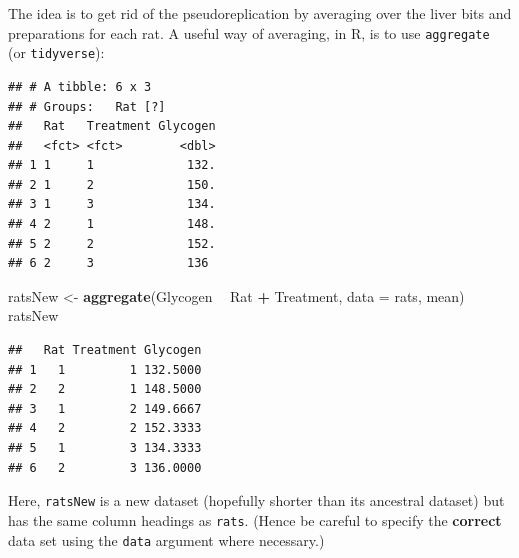 \documentclass[]{book}
\newenvironment{Shaded}{\begin{snugshade}}{\end{snugshade}}
\newcommand{\KeywordTok}[1]{\textcolor[rgb]{0.13,0.29,0.53}{\textbf{#1}}}
\newcommand{\DataTypeTok}[1]{\textcolor[rgb]{0.13,0.29,0.53}{#1}}
\newcommand{\StringTok}[1]{\textcolor[rgb]{0.31,0.60,0.02}{#1}}
\newcommand{\OperatorTok}[1]{\textcolor[rgb]{0.81,0.36,0.00}{\textbf{#1}}}
\newcommand{\NormalTok}[1]{#1}
\newcommand{\bmp}{\begin{minipage}[c]{0.5\textwidth}}
\newcommand{\emp}{\end{minipage}}
\newcommand{\bblockST}[1]{\begin{tcolorbox}[title = #1, colframe=taskCol1, breakable, parbox = false]}
\newcommand{\eblockST}{\end{tcolorbox}}
\theoremstyle{definition}
\theoremstyle{definition}
\theoremstyle{definition}
\theoremstyle{remark}
\begin{document}
The idea is to get rid of the pseudoreplication by averaging over the
liver bits and preparations for each rat. A useful way of averaging, in
R, is to use \texttt{aggregate} (or \texttt{tidyverse}):

\bmp
\bblockST{\texttt{tidyverse}}

\begin{Shaded}
\end{Shaded}

\begin{verbatim}
## # A tibble: 6 x 3
## # Groups:   Rat [?]
##   Rat   Treatment Glycogen
##   <fct> <fct>        <dbl>
## 1 1     1             132.
## 2 1     2             150.
## 3 1     3             134.
## 4 2     1             148.
## 5 2     2             152.
## 6 2     3             136
\end{verbatim}

\eblockST
\emp
\hspace{0.01\textwidth} \bmp\bblockST{Base R}

\begin{Shaded}
\begin{Highlighting}[]
\NormalTok{ratsNew <-}\StringTok{ }\KeywordTok{aggregate}\NormalTok{(Glycogen }\OperatorTok{~}\StringTok{ }\NormalTok{Rat }\OperatorTok{+}\StringTok{ }
\StringTok{    }\NormalTok{Treatment, }\DataTypeTok{data =}\NormalTok{ rats, mean)}
\NormalTok{ratsNew}
\end{Highlighting}
\end{Shaded}

\begin{verbatim}
##   Rat Treatment Glycogen
## 1   1         1 132.5000
## 2   2         1 148.5000
## 3   1         2 149.6667
## 4   2         2 152.3333
## 5   1         3 134.3333
## 6   2         3 136.0000
\end{verbatim}

\eblockST
\emp

Here, \texttt{ratsNew} is a new dataset (hopefully shorter than its
ancestral dataset) but has the same column headings as \texttt{rats}.
(Hence be careful to specify the \textbf{correct} data set using the
\texttt{data} argument where necessary.)
\end{document}
